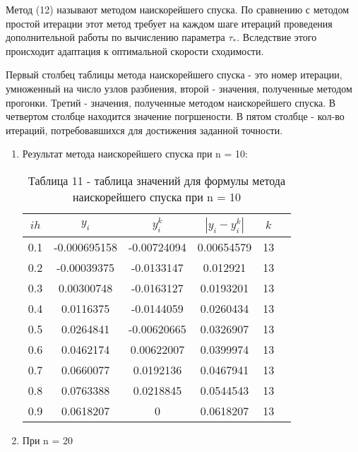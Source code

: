 \documentclass[a4paper,12pt]{article}
\begin{document}
Метод (12) называют методом наискорейшего спуска. По сравнению с методом простой итерации этот метод
требует на каждом шаге итераций проведения дополнительной работы по вычислению параметра $\tau_*$. 
Вследствие этого происходит адаптация к оптимальной скорости сходимости.

Первый столбец таблицы метода наискорейшего спуска - это номер итерации, \\
умноженный на число узлов разбиения, второй - значения, полученные методом 
прогонки. Третий - значения, полученные методом наискорейшего спуска. В четвертом столбце находится значение погршености.
В пятом столбце - кол-во итераций, потребовавшихся для достижения заданной точности.

\begin{enumerate}[label = \arabic*.]
  \item{Результат метода наискорейшего спуска при n = 10:
    \begin{table}[h]
      \centering
      \begin{tabular}{|c|c|c|c|c|c|}
        \hline
        $ih$ & $y_i$ & $y^k_i$ & $\left|y_i-y^k_i\right|$ & $k$\\ \hline
        0.1 & -0.000695158 &  -0.00724094 &   0.00654579 & 13\\ \hline
        0.2 &  -0.00039375 &   -0.0133147 &     0.012921 & 13\\ \hline
        0.3 &   0.00300748 &   -0.0163127 &    0.0193201 & 13\\ \hline
        0.4 &    0.0116375 &   -0.0144059 &    0.0260434 & 13\\ \hline
        0.5 &    0.0264841 &  -0.00620665 &    0.0326907 & 13\\ \hline
        0.6 &    0.0462174 &   0.00622007 &    0.0399974 & 13\\ \hline
        0.7 &    0.0660077 &    0.0192136 &    0.0467941 & 13\\ \hline
        0.8 &    0.0763388 &    0.0218845 &    0.0544543 & 13\\ \hline
        0.9 &    0.0618207 &            0 &    0.0618207 & 13\\ \hline
      \end{tabular}
      \caption*{\small{Таблица 11 - таблица значений для формулы метода наискорейшего спуска при n = 10}}
    \end{table}
  }
  \newpage
  \item{При n = 20
    \begin{table}[h]
      \centering
      \begin{tabular}{|c|c|c|c|c|}

\end{tabular}
\end{table}}
\end{enumerate}
\end{document}
